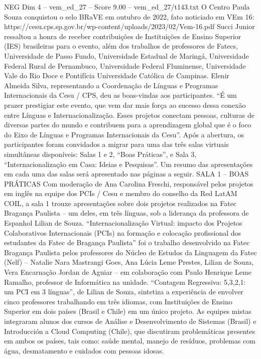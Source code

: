 \begin{textsample}{NEG Dim 4 – vem\_ed\_27 – Score 9.00 – vem\_ed\_27/t143.txt}
O Centro Paula Souza conquistou o selo BRaVE em outubro de 2022, fato noticiado em VEm 16: https://cesu.cps.sp.gov.br/wp-content/uploads/2023/02/Vem-16.pdf Succi Junior ressaltou a honra de receber contribuições de Instituições de Ensino Superior (IES) brasileiras para o evento, além dos trabalhos de professores de Fatecs, Universidade de Passo Fundo, Universidade Estadual de Maringá, Universidade Federal Rural de Pernambuco, Universidade Federal Fluminense, Universidade Vale do Rio Doce e Pontifícia Universidade Católica de Campinas.
Elenir Almeida Silva, representando a Coordenação de Línguas e Programas Internacionais da Cesu / CPS, deu as boas-vindas aos participantes. “É um prazer prestigiar este evento, que vem dar mais força ao sucesso dessa conexão entre Línguas e Internacionalização.
Esses projetos conectam pessoas, culturas de diversas partes do mundo e contribuem para a aprendizagem global que é o foco do Eixo de Línguas e Programas Internacionais da Cesu”.
Após a abertura, os participantes foram convidados a migrar para uma das três salas virtuais simultâneas disponíveis: Salas 1 e 2, “Boas Práticas”, e Sala 3, “Internacionalização em Casa: Ideias e Pesquisas”.
Um resumo das apresentações em cada uma das salas será apresentado nas páginas a seguir.
SALA 1 – BOAS PRÁTICAS Com moderação de Ana Carolina Freschi, responsável pelos projetos em inglês na equipe dos PCIs / Cesu e membro do conselho da Red LatAM COIL, a sala 1 trouxe apresentações sobre dois projetos realizados na Fatec Bragança Paulista – um deles, em três línguas, sob a liderança da professora de Espanhol Lilian de Souza. “Internacionalização Virtual: impacto dos Projetos Colaborativos Internacionais (PCIs) na formação e colocação profissional dos estudantes da Fatec de Bragança Paulista” foi o trabalho desenvolvido na Fatec Bragança Paulista pelos professores do Núcleo de Estudos da Linguagem da Fatec (Nelf) – Natalie Nara Mastrangi Goes, Ana Lúcia Leme Prestes, Lilian de Souza, Vera Encarnação Jordan de Aguiar – em colaboração com Paulo Henrique Leme Ramalho, professor de Informática na unidade. “Contagem Regressiva: 5,3,2,1: um PCI em 3 línguas”, de Lilian de Souza, sintetiza a experiência de envolver cinco professores trabalhando em três idiomas, com Instituições de Ensino Superior em dois países (Brasil e Chile) em um único projeto.
As equipes mistas integraram alunos dos cursos de Análise e Desenvolvimento de Sistemas (Brasil) e Introducción a Cloud Computing (Chile), que discutiram problemáticas presentes em ambos os países, tais como: saúde mental, manejo de resíduos, problemas com água, desmatamento e cuidados com pessoas idosas.

\end{textsample}
